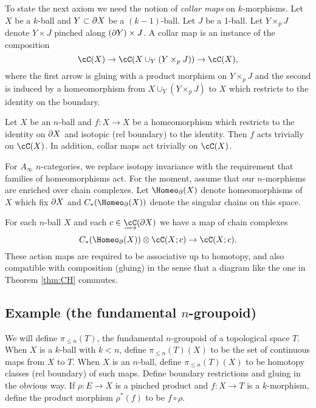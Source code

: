 \documentclass{pnastwo}
\begin{document}
\begin{article}
To state the next axiom we need the notion of {\it collar maps} on $k$-morphisms.
Let $X$ be a $k$-ball and $Y\subset\partial X$ be a $(k{-}1)$-ball.
Let $J$ be a 1-ball.
Let $Y\times_p J$ denote $Y\times J$ pinched along $(\partial Y)\times J$.
A collar map is an instance of the composition
\[
	\cC(X) \to \cC(X\cup_Y (Y\times_p J)) \to \cC(X) ,
\]
where the first arrow is gluing with a product morphism on $Y\times_p J$ and
the second is induced by a homeomorphism from $X\cup_Y (Y\times_p J)$ to $X$ which restricts
to the identity on the boundary.


\begin{axiom}
\label{axiom:extended-isotopies}
Let $X$ be an $n$-ball and $f: X\to X$ be a homeomorphism which restricts
to the identity on $\partial X$ and isotopic (rel boundary) to the identity.
Then $f$ acts trivially on $\cC(X)$.
In addition, collar maps act trivially on $\cC(X)$.
\end{axiom}

\smallskip

For $A_\infty$ $n$-categories, we replace
isotopy invariance with the requirement that families of homeomorphisms act.
For the moment, assume that our $n$-morphisms are enriched over chain complexes.
Let $\Homeo_\bd(X)$ denote homeomorphisms of $X$ which fix $\partial X$ and
$C_*(\Homeo_\bd(X))$ denote the singular chains on this space.


\begin{axiom}
\label{axiom:families}
For each $n$-ball $X$ and each $c\in \cl{\cC}(\bd X)$ we have a map of chain complexes
\[
	C_*(\Homeo_\bd(X))\ot \cC(X; c) \to \cC(X; c) .
\]
These action maps are required to be associative up to homotopy,
and also compatible with composition (gluing) in the sense that
a diagram like the one in Theorem \ref{thm:CH} commutes.
\end{axiom}

\subsection{Example (the fundamental $n$-groupoid)}
We will define $\pi_{\le n}(T)$, the fundamental $n$-groupoid of a topological space $T$.
When $X$ is a $k$-ball with $k<n$, define $\pi_{\le n}(T)(X)$
to be the set of continuous maps from $X$ to $T$.
When $X$ is an $n$-ball, define $\pi_{\le n}(T)(X)$ to be homotopy classes (rel boundary) of such maps.
Define boundary restrictions and gluing in the obvious way.
If $\rho:E\to X$ is a pinched product and $f:X\to T$ is a $k$-morphism,
define the product morphism $\rho^*(f)$ to be $f\circ\rho$.


\end{article}
\end{document}
